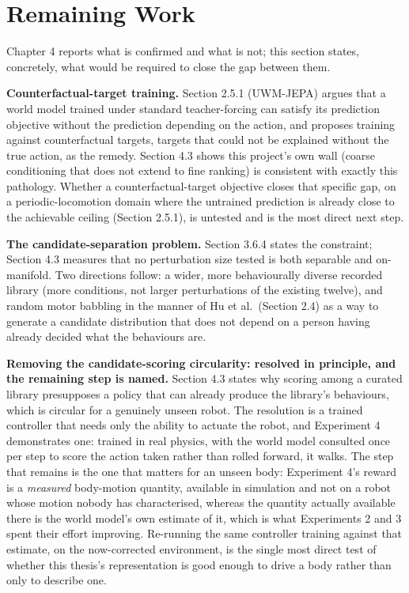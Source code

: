 \documentclass[12pt,a4paper,oneside]{report}
\begin{document}
\section{Remaining Work}
Chapter 4 reports what is confirmed and what is not; this section states, concretely, what would be required to
close the gap between them.

\noindent\textbf{Counterfactual-target training.} Section 2.5.1 (UWM-JEPA) argues that a world model trained under
standard teacher-forcing can satisfy its prediction objective without the prediction depending on the action, and
proposes training against counterfactual targets, targets that could not be explained without the true action,
as the remedy. Section 4.3 shows this project's own wall (coarse conditioning that does not extend to fine
ranking) is consistent with exactly this pathology. Whether a counterfactual-target objective closes that specific
gap, on a periodic-locomotion domain where the untrained prediction is already close to the achievable ceiling
(Section 2.5.1), is untested and is the most direct next step.

\noindent\textbf{The candidate-separation problem.} Section 3.6.4 states the constraint; Section 4.3 measures that
no perturbation size tested is both separable and on-manifold. Two directions follow: a wider, more behaviourally
diverse recorded library (more conditions, not larger perturbations of the existing twelve), and random motor
babbling in the manner of Hu et al.\ (Section 2.4) as a way to generate a candidate distribution that does not
depend on a person having already decided what the behaviours are.

\noindent\textbf{Removing the candidate-scoring circularity: resolved in principle, and the remaining step is
named.} Section 4.3 states why scoring among a curated library presupposes a policy that can already produce the
library's behaviours, which is circular for a genuinely unseen robot. The resolution is a trained controller that
needs only the ability to actuate the robot, and Experiment 4 demonstrates one: trained in real physics, with the
world model consulted once per step to score the action taken rather than rolled forward, it walks. The step that
remains is the one that matters for an unseen body: Experiment 4's reward is a \emph{measured} body-motion
quantity, available in simulation and not on a robot whose motion nobody has characterised, whereas the quantity
actually available there is the world model's own estimate of it, which is what Experiments 2 and 3 spent their
effort improving. Re-running the same controller training against that estimate, on the now-corrected environment,
is the single most direct test of whether this thesis's representation is good enough to drive a body rather than
only to describe one.
\end{document}
